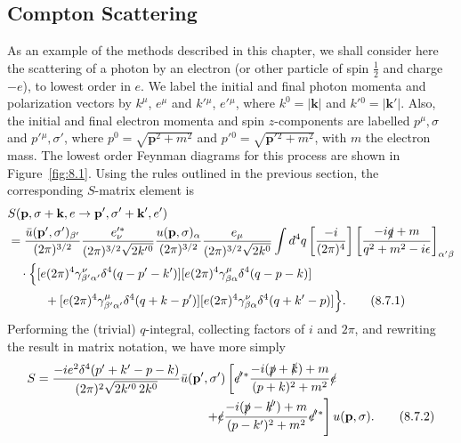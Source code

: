 
\subsection{Compton Scattering}

As an example of the methods described in this chapter, we shall consider
here the scattering of a photon by an electron (or other particle of spin
$\tfrac12$ and charge $-e$), to lowest order in $e$. We label the initial and
final photon momenta and polarization vectors by $k^\mu$, $e^\mu$ and
$k'{}^\mu$, $e'{}^\mu$, where $k^0=|\mathbf{k}|$ and
$k'{}^0=|\mathbf{k}'|$. Also, the initial and final electron momenta and spin
$z$-components are labelled $p^\mu,\sigma$ and $p'{}^\mu,\sigma'$, where
$p^0=\sqrt{\mathbf p^2+m^2}$ and $p'{}^0=\sqrt{\mathbf p'{}^2+m^2}$, with $m$
the electron mass. The lowest order Feynman diagrams for this process are
shown in Figure~\ref{fig:8.1}. Using the rules outlined in the previous section, the
corresponding $S$-matrix element is
\begin{align}
&S(\mathbf p,\sigma+\mathbf k,e\to
       \mathbf p',\sigma'+\mathbf k',e') \notag\\
&={\bar u(\mathbf p',\sigma')_{\beta'}\over(2\pi)^{3/2}}
 {e'^*_{\nu}\over(2\pi)^{3/2}\sqrt{2k'{}^0}}
 {u(\mathbf p,\sigma)_\alpha\over(2\pi)^{3/2}}
 {e_\mu\over(2\pi)^{3/2}\sqrt{2k^0}}
 \int d^4q\left[\frac{-i}{(2\pi)^4}\right]
 \left[\frac{-i\sl{q}+m}{q^2+m^2-i\epsilon}\right]_{\alpha'\beta}
 \notag\\
&\quad\cdot\Bigl\{
 [e(2\pi)^4\gamma^\nu_{\beta'\alpha'}\delta^4(q-p'-k')]
 [e(2\pi)^4\gamma^\mu_{\beta\alpha}\delta^4(q-p-k)]
 \notag\\
&\qquad\quad+
 [e(2\pi)^4\gamma^\mu_{\beta'\alpha'}\delta^4(q+k-p')]
 [e(2\pi)^4\gamma^\nu_{\beta\alpha}\delta^4(q+k'-p)]
 \Bigr\}.
\tag{8.7.1}\label{eq:8.7.1}
\end{align}
Performing the (trivial) $q$-integral, collecting factors of $i$ and $2\pi$,
and rewriting the result in matrix notation, we have more simply
\begin{align}
S={}&{-ie^2\delta^4(p'+k'-p-k)\over
 (2\pi)^2\sqrt{2k'{}^0\,2k^0}}\bar u(\mathbf p',\sigma')
 \left[\sl{e'}{}^*
 { -i(\sl{p}+\sl{k})+m\over(p+k)^2+m^2}\sl{e}\right.
 \notag\\[-2pt]
&\left.\hspace{43mm}+\sl{e}
 { -i(\sl{p}-\sl{k'})+m\over(p-k')^2+m^2}
 \sl{e'}{}^*\right]u(\mathbf p,\sigma).
\tag{8.7.2}\label{eq:8.7.2}
\end{align}

